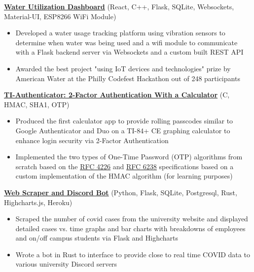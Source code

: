 \documentclass{article}
\begin{document}
\textbf{\href{https://github.com/jshin313/AquaQuant}{\underline{Water Utilization Dashboard}}} \hfill (React, C++, Flask, SQLite, Websockets, Material-UI, ESP8266 WiFi Module)
\begin{itemize}
    \item Developed a water usage tracking platform using vibration sensors to determine when water was being used and a wifi module to communicate with a Flask backend server via Websockets and a custom built REST API
    \item Awarded the best project "using IoT devices and technologies" prize by American Water at the Philly Codefest Hackathon out of 248 participants
\end{itemize}

\textbf{\href{https://github.com/jshin313/ti-authenticator}{\underline{TI-Authenticator: 2-Factor Authentication With a Calculator}}} \hfill (C, HMAC, SHA1, OTP)
\begin{itemize}
    \item Produced the first calculator app to provide rolling passcodes similar to Google Authenticator and Duo on a TI-84+ CE graphing calculator to enhance login security via 2-Factor Authentication
    \item Implemented the two types of One-Time Password (OTP) algorithms from scratch based on the \href{https://tools.ietf.org/html/rfc4226}{\underline{RFC 4226}} and \href{https://tools.ietf.org/html/rfc6238}{\underline{RFC 6238}} specifications based on a custom implementation of the HMAC algorithm (for learning purposes)
\end{itemize}

\textbf{\href{https://github.com/jshin313/unofficial-temple-covid-live-dashboard}{\underline{Web Scraper and Discord Bot}}} \hfill (Python, Flask, SQLite, Postgresql, Rust, Highcharts.js, Heroku)
\begin{itemize}
    \item Scraped the number of covid cases from the university website and displayed detailed cases vs. time graphs and bar charts with breakdowns of employees and on/off campus students via Flask and Highcharts
    \item Wrote a bot in Rust to interface to provide close to real time COVID data to various university Discord servers
\end{itemize}
\end{document}
